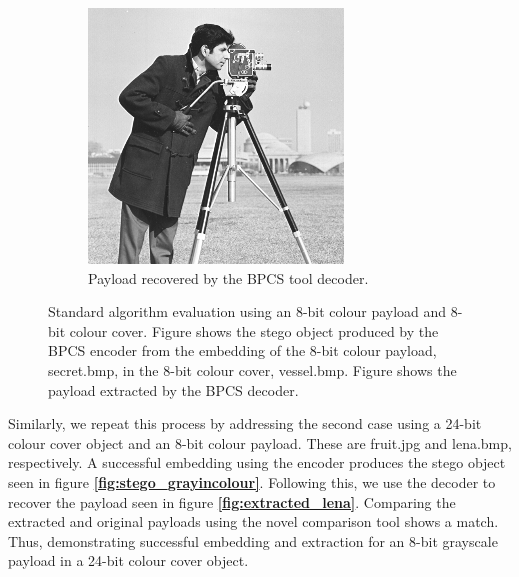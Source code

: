 \documentclass{l4proj}
\begin{document}
\begin{figure}[]
\begin{subfigure}[b]{0.4\textwidth}
        \includegraphics[width=\textwidth]{images/extracted.png}
        \caption{Payload recovered by the BPCS tool decoder.}
        \label{fig:extracted_object}
    \end{subfigure}
    \caption{Standard algorithm evaluation using an 8-bit colour payload and 8-bit colour cover. Figure  shows the stego object produced by the BPCS encoder from the embedding of the 8-bit colour payload, secret.bmp, in the 8-bit colour cover, vessel.bmp. Figure  shows the payload extracted by the BPCS decoder.}
\end{figure}

Similarly, we repeat this process by addressing the second case using a 24-bit colour cover object and an 8-bit colour payload. These are fruit.jpg and lena.bmp, respectively. A successful embedding using the encoder produces the stego object seen in figure \textbf{\ref{fig:stego_grayincolour}}. Following this, we use the decoder to recover the payload seen in figure \textbf{\ref{fig:extracted_lena}}. Comparing the extracted and original payloads using the novel comparison tool shows a match. Thus, demonstrating successful embedding and extraction for an 8-bit grayscale payload in a 24-bit colour cover object.
\end{document}

